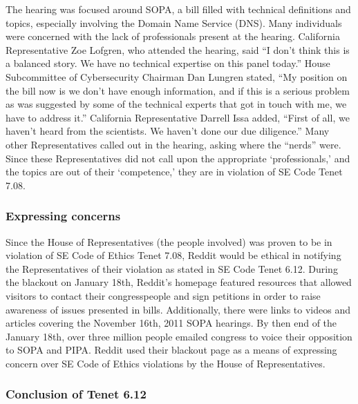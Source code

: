 \documentclass[11pt]{article}
\begin{document}
\begin{multicols}{2}
The hearing was focused around SOPA, a bill filled with technical definitions and topics, especially involving the Domain Name Service (DNS).\cite{sopa} Many individuals were concerned with the lack of professionals present at the hearing. California Representative Zoe Lofgren, who attended the hearing, said ``I don’t think this is a balanced story. We have no technical expertise on this panel today.''\cite{no-nerds-katy-bachman} House Subcommittee of Cybersecurity Chairman Dan Lungren stated, ``My position on the bill now is we don’t have enough information, and if this is a serious problem as was suggested by some of the technical experts that got in touch with me, we have to address it.''\cite{no-nerds-tony-romm} California Representative Darrell Issa added, ``First of all, we haven't heard from the scientists. We haven't done our due diligence.''\cite{sopa-hearings-atlantic} Many other Representatives called out in the hearing, asking where the ``nerds'' were.\cite{sopa-hearings-atlantic} Since these Representatives did not call upon the appropriate `professionals,' and the topics are out of their `competence,' they are in violation of SE Code Tenet 7.08.

   \subsubsection{Expressing concerns}

Since the House of Representatives (the people involved) was proven to be in violation of SE Code of Ethics Tenet 7.08, Reddit would be ethical in notifying the Representatives of their violation as stated in SE Code Tenet 6.12. During the blackout on January 18th, Reddit's homepage featured resources that allowed visitors to contact their congresspeople and sign petitions in order to raise awareness of issues presented in bills.\cite{reddit-blackout-site} Additionally, there were links to videos and articles covering the November 16th, 2011 SOPA hearings.\cite{reddit-blackout-site} By then end of the January 18th, over three million people emailed congress to voice their opposition to SOPA and PIPA\cite{nytimes-public-outcry}. Reddit used their blackout page as a means of expressing concern over SE Code of Ethics violations by the House of Representatives.

   \subsubsection{Conclusion of Tenet 6.12}


\end{multicols}
\end{document}
